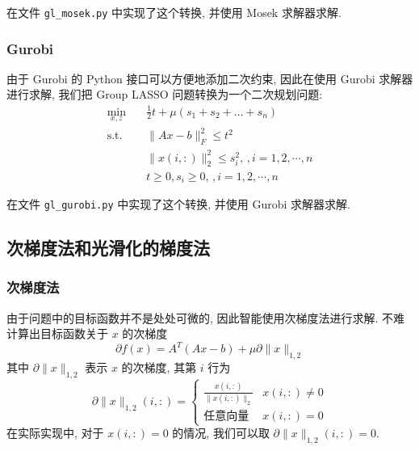 \documentclass{article}
\begin{document}
在文件 \verb|gl_mosek.py| 中实现了这个转换, 并使用 Mosek 求解器求解.

\subsubsection{Gurobi}
由于 Gurobi 的 Python 接口可以方便地添加二次约束, 因此在使用 Gurobi 求解器进行求解, 我们把 Group LASSO 问题转换为一个二次规划问题:
\begin{equation*}
    \begin{aligned}
        \min_{x, z}\quad & \frac{1}{2} t + \mu (s_1 + s_2 + ... + s_n)\\
        \text{s.t.}\quad &\|Ax-b\|_F^2 \le t^2\\
        &\|x(i, :)\|_2^2 \le s_i^2,\,, i = 1, 2, \cdots, n\\
        &t \ge 0, s_i \ge 0,\,, i = 1, 2, \cdots, n
    \end{aligned}
\end{equation*}

在文件 \verb|gl_gurobi.py| 中实现了这个转换, 并使用 Gurobi 求解器求解.

\subsection{次梯度法和光滑化的梯度法}

\subsubsection{次梯度法}
由于问题中的目标函数并不是处处可微的, 因此智能使用次梯度法进行求解. 不难计算出目标函数关于 $x$ 的次梯度
\begin{equation*}
    \partial f(x) = A^T(Ax - b) + \mu \partial \|x\|_{1,2}
\end{equation*}
其中 $\partial \|x\|_{1,2}$ 表示 $x$ 的次梯度, 其第 $i$ 行为
\begin{equation*}
    \partial \|x\|_{1,2}(i, :) =
    \begin{cases}
        \frac{x(i, :)}{\|x(i, :)\|_2} & x(i, :) \neq 0\\
        \text{任意向量} & x(i, :) = 0
    \end{cases}
\end{equation*}
在实际实现中, 对于 $x(i, :) = 0$ 的情况, 我们可以取 $\partial \|x\|_{1,2}(i, :)=0$.
\end{document}
